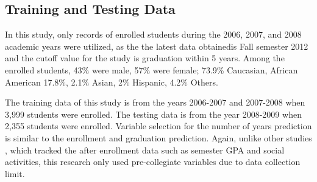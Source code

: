 \documentclass[12pt,english]{report}
\begin{document}
\subsection{Training and Testing Data}
In this study, only records of enrolled students  during  the 2006, 2007, and 2008 academic years were utilized, as the the latest data obtainedis Fall semester 2012 and the cutoff value for the study is graduation within 5 years.   Among the enrolled students, 43\% were male, 57\% were female;  73.9\% Caucasian, African American 17.8\%,  2.1\% Asian, 2\% Hispanic, 4.2\% Others. 

The training data of this study is from the years 2006-2007 and 2007-2008 when 3,999 students were enrolled. The testing data is from the year 2008-2009 when 2,355 students were enrolled. %
Variable selection for the number of years prediction is similar to the enrollment and graduation prediction. Again, unlike other studies \citep{Lin2009, deberard2004predictors, dekker2009}, which tracked the after enrollment data such as semester GPA and social activities, this research only used pre-collegiate variables due to data collection limit.

\end{document}
